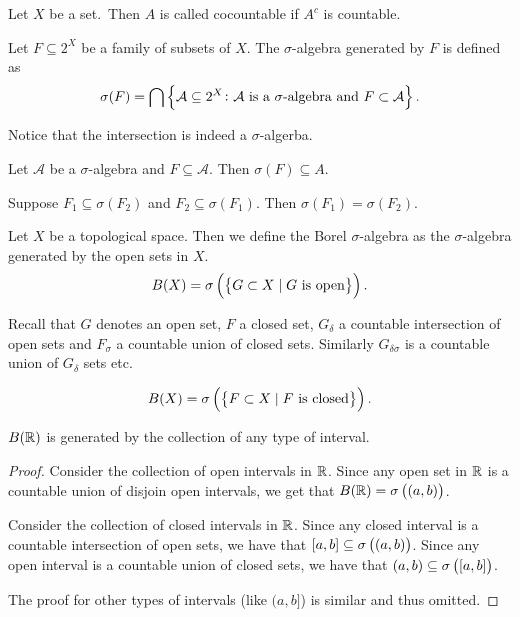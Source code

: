\documentclass[11pt,a4paper]{article}
\newcommand{\A}{\mathcal A}
\begin{document}
\begin{definition}[Cocountablility]
  Let $X$ be a set.\ Then $A$ is called cocountable if $A^c$ is countable.
\end{definition}

\begin{example}
  Let $F \subseteq 2^X$ be a family of subsets of $X$.
  The $\sigma$-algebra generated by $F$ is defined as
  \[
    \sigma(F) = \bigcap \set{\mathcal A \subseteq 2^X \colon 
    \A \text{ is a $\sigma$-algebra} \stand F \subset \A}.
  \]
\end{example}
\begin{remark}
  Notice that the intersection is indeed a $\sigma$-algerba.
\end{remark}
\begin{remark}
  Let $\A$ be a $\sigma$-algebra and $F \subseteq \A$.
  Then $\sigma(F) \subseteq A$.
\end{remark}
\begin{corollary}
  Suppose $F_1 \subseteq \sigma(F_2)$ and $F_2 \subseteq \sigma(F_1)$.
  Then $\sigma(F_1) = \sigma(F_2)$.
\end{corollary}

\begin{definition}
  Let $X$ be a topological space.
  Then we define the Borel $\sigma$-algebra as the $\sigma$-algebra generated
  by the open sets in $X$.
  \[
    B(X) = \sigma\del{\set{G \subset X \mid G \text{ is open}}}.
  \]
\end{definition}
\begin{remark}
  Recall that $G$ denotes an open set, $F$ a closed set, $G_{\delta}$
  a countable intersection of open sets and $F_{\sigma}$ a countable
  union of closed sets.
  Similarly $G_{\delta \sigma}$ is a countable union of $G_{\delta}$ sets
  etc.
\end{remark}
\begin{remark}
  \[
    B(X) = \sigma\del{\set{F \subset X \mid F \text{ is closed}}}.
  \]
\end{remark}

\begin{proposition}
  $B(\mathbb{R})$ is generated by the collection of any type of interval.
\end{proposition}
\begin{proof}
  Consider the collection of open intervals in $\mathbb{R}$.
  Since any open set in $\mathbb{R}$ is a countable union of disjoin open intervals,
  we get that $B(\R) = \sigma\del{(a,b)}$.

  Consider the collection of closed intervals in $\mathbb{R}$.
  Since any closed interval is a countable intersection of open sets,
  we have that $[a,b] \subseteq \sigma\del{(a,b)}$.
  Since any open interval is a countable union of closed sets,
  we have that $(a,b) \subseteq \sigma\del{[a,b]}$.
  
  The proof for other types of intervals (like $(a,b]$) is similar and thus
  omitted.
\end{proof}
\end{document}

